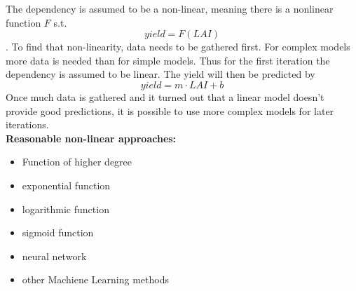 The dependency is assumed to be a non-linear, meaning there is a nonlinear function $F$ s.t. $$yield = F(LAI)$$. To find that non-linearity, data needs to be gathered first. For complex models more data is needed than for simple models. Thus for the first iteration the dependency is assumed to be linear. The yield will then be predicted by
$$yield = m\cdot LAI + b$$
Once much data is gathered and it turned out that a linear model doesn't provide good
predictions, it is possible to use more complex models for later iterations.\\

\textbf{Reasonable non-linear approaches:}

\begin{itemize}
   \item Function of higher degree
   \item exponential function
   \item logarithmic function
   \item sigmoid function
   \item neural network
   \item other Machiene Learning methods
\end{itemize}
